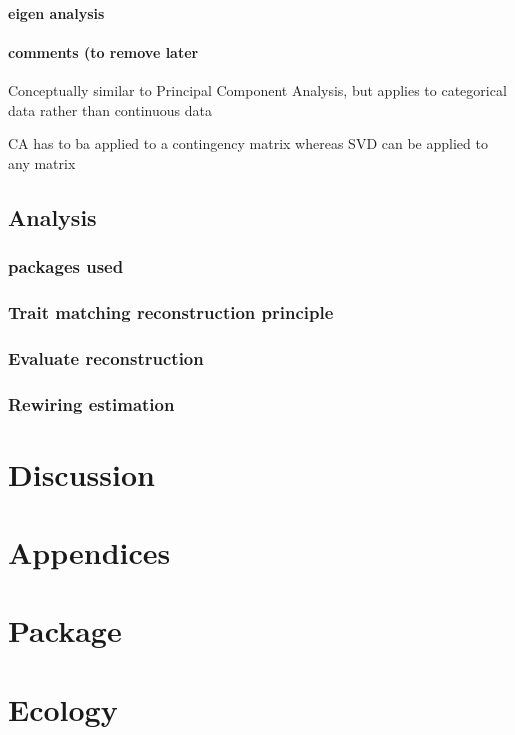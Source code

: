 \documentclass{article}
\begin{document}
\paragraph{eigen analysis}

\paragraph{comments (to remove later}
Conceptually similar to Principal Component Analysis, but applies to categorical data rather than continuous data

CA has to ba applied to a contingency matrix whereas SVD can be applied to any matrix

\subsection{Analysis}

\subsubsection{packages used}

\subsubsection{Trait matching reconstruction principle}

\subsubsection{Evaluate reconstruction}

\subsubsection{Rewiring estimation}

\section{Discussion}

\section{Appendices}

\section{Package}

\section{Ecology}
\end{document}
